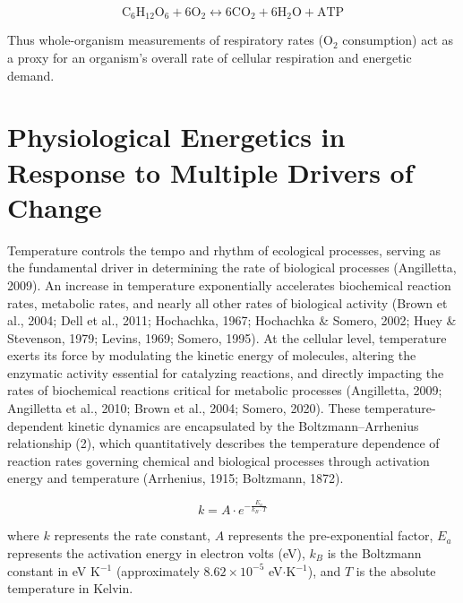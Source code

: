 \documentclass{CSUNthesis}
\begin{document}
\begin{equation}
\label{eq:respiration}
\mathrm{C_6H_{12}O_6 + 6O_2 \leftrightarrow 6CO_2 + 6H_2O + ATP}
\end{equation}

Thus whole-organism measurements of respiratory rates (O\(_2\) consumption) act as a proxy for an organism's overall rate of cellular respiration and energetic demand.

\section*{Physiological Energetics in Response to Multiple Drivers of Change}\label{physiological-energetics-in-response-to-multiple-drivers-of-change}

Temperature controls the tempo and rhythm of ecological processes, serving as the fundamental driver in determining the rate of biological processes (Angilletta, 2009). An increase in temperature exponentially accelerates biochemical reaction rates, metabolic rates, and nearly all other rates of biological activity (Brown et al., 2004; Dell et al., 2011; Hochachka, 1967; Hochachka \& Somero, 2002; Huey \& Stevenson, 1979; Levins, 1969; Somero, 1995). At the cellular level, temperature exerts its force by modulating the kinetic energy of molecules, altering the enzymatic activity essential for catalyzing reactions, and directly impacting the rates of biochemical reactions critical for metabolic processes (Angilletta, 2009; Angilletta et al., 2010; Brown et al., 2004; Somero, 2020). These temperature-dependent kinetic dynamics are encapsulated by the Boltzmann--Arrhenius relationship (2), which quantitatively describes the temperature dependence of reaction rates governing chemical and biological processes through activation energy and temperature (Arrhenius, 1915; Boltzmann, 1872).

\begin{equation}
\label{eq:boltzmann}
k = A \cdot e^{-\frac{E_a}{k_B \cdot T}}
\end{equation}

where \(k\) represents the rate constant, \(A\) represents the pre-exponential factor, \(E_a\) represents the activation energy in electron volts (eV), \(k_B\) is the Boltzmann constant in eV K\(^{-1}\) (approximately \(8.62 \times 10^{-5}\) eV\(\cdot\)K\(^{-1}\)), and \(T\) is the absolute temperature in Kelvin.
\end{document}
